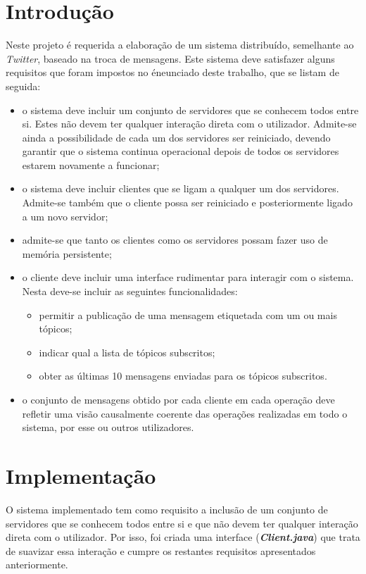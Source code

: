 \documentclass[a4paper]{report}
\begin{document}
\chapter{Introdução} \label{intro}
\large{
	Neste projeto é requerida a elaboração de um sistema distribuído, semelhante ao \textit{Twitter}, baseado na troca de mensagens. Este sistema deve satisfazer alguns requisitos que foram impostos no éneunciado deste trabalho, que se listam de seguida:
	\begin{itemize}
		\item o sistema deve incluir um conjunto de servidores que se conhecem todos entre si. Estes não devem ter qualquer interação direta com o utilizador. Admite-se ainda a possibilidade de cada um dos servidores ser reiniciado, devendo garantir que o sistema continua operacional depois de todos os servidores estarem novamente a funcionar;
		\item o sistema deve incluir clientes que se ligam a qualquer um dos servidores. Admite-se também que o cliente possa ser reiniciado e posteriormente ligado a um novo servidor;
		\item admite-se que tanto os clientes como os servidores possam fazer uso de memória persistente;
		\item o cliente deve incluir uma interface rudimentar para interagir com o sistema. Nesta deve-se incluir as seguintes funcionalidades:
		\begin{itemize}
			\item permitir a publicação de uma mensagem etiquetada com um ou mais tópicos;
			\item indicar qual a lista de tópicos subscritos;
			\item obter as últimas 10 mensagens enviadas para os tópicos subscritos.
		\end{itemize}
		\item o conjunto de mensagens obtido por cada cliente em cada operação deve refletir uma visão causalmente coerente das operações realizadas em todo o sistema, por esse ou outros utilizadores.
	\end{itemize}
}

\chapter{Implementação}
	O sistema implementado tem como requisito a inclusão de um conjunto de servidores que se conhecem todos entre si e que não devem ter qualquer interação direta com o utilizador.
	Por isso, foi criada uma interface (\textbf{\textit{Client.java}}) que trata de suavizar essa interação e cumpre os restantes requisitos apresentados anteriormente.
\end{document}
